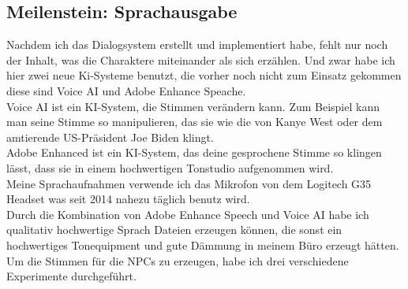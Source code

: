 \documentclass[10pt,a4paper,bibliography=totocnumbered,listof=totocnumbered]{scrartcl}
\begin{document}
\subsection {Meilenstein: Sprachausgabe}
Nachdem ich das Dialogsystem erstellt und implementiert habe, fehlt nur noch der Inhalt, was die Charaktere miteinander als sich erzählen. Und zwar habe ich hier zwei neue Ki-Systeme benutzt, die vorher noch nicht zum Einsatz gekommen diese sind Voice AI und Adobe Enhance Speache.
\\
Voice AI ist ein KI-System, die Stimmen verändern kann. Zum Beispiel kann man seine Stimme so manipulieren, das sie wie die von Kanye West oder dem amtierende US-Präsident Joe Biden klingt.
\\
Adobe Enhanced ist ein KI-System, das deine gesprochene Stimme so klingen lässt, dass sie in einem hochwertigen Tonstudio aufgenommen wird.
\\
Meine Sprachaufnahmen verwende ich das Mikrofon von dem Logitech G35 Headset was seit 2014 nahezu täglich benutz wird.
\\
Durch die Kombination von Adobe Enhance Speech und Voice AI habe ich qualitativ hochwertige Sprach Dateien erzeugen können, die sonst ein hochwertiges Tonequipment und gute Dämmung in meinem Büro erzeugt hätten.
\\
Um die Stimmen für die NPCs zu erzeugen, habe ich drei verschiedene Experimente durchgeführt.
\\
\end{document}
